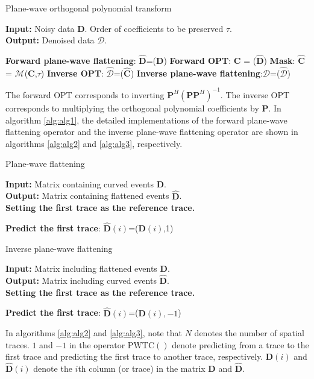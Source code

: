 \begin{algorithm}
  \caption{Plane-wave orthogonal polynomial transform}
  \textbf{Input:} Noisy data $\mathbf{D}$. Order of coefficients to be preserved $\tau$. \\
  \textbf{Output:} Denoised data $\mathcal{D}$. 
   \begin{algorithmic}[1]
     \State \textbf{Forward plane-wave flattening}: $\hat{\mathbf{D}}$=($\mathbf{D}$)
     \State \textbf{Forward OPT}: $\mathbf{C}$ = ($\hat{\mathbf{D}}$) 
     \State \textbf{Mask}:   $\hat{\mathbf{C}}$ = $\mathcal{M}$($\mathbf{C}$,$\tau$)
     \State \textbf{Inverse OPT}: $\hat{\mathcal{D}}$=($\hat{\mathbf{C}}$)
     \State \textbf{Inverse plane-wave flattening}:$\mathcal{D}$=($\hat{\mathcal{D}}$)
\end{algorithmic}
\label{alg:alg1}
\end{algorithm}
The forward OPT corresponds to inverting $\mathbf{P}^H(\mathbf{P}\mathbf{P}^H)^{-1}$. The inverse OPT corresponds to multiplying the orthogonal polynomial coefficients by $\mathbf{P}$. In algorithm \ref{alg:alg1}, the detailed implementations of the forward plane-wave flattening operator and the inverse plane-wave flattening operator are shown in algorithms \ref{alg:alg2} and \ref{alg:alg3}, respectively.

\begin{algorithm}
  \caption{Plane-wave flattening}
  \textbf{Input:} Matrix containing curved events $\mathbf{D}$. \\
  \textbf{Output:} Matrix containing flattened events $\hat{\mathbf{D}}$. \\
   \textbf{Setting the first trace as the reference trace.}
   \begin{algorithmic}[1]
    \State \textbf{Predict the first trace}: $\hat{\mathbf{D}}(i)$=($\mathbf{D}(i)$,1)  
       \EndFor
\end{algorithmic}
\label{alg:alg2}
\end{algorithm}

\begin{algorithm}
  \caption{Inverse plane-wave flattening}
  \textbf{Input:} Matrix including flattened events $\mathbf{D}$. \\
  \textbf{Output:} Matrix including curved events $\hat{\mathbf{D}}$. \\
   \textbf{Setting the first trace as the reference trace.}
   \begin{algorithmic}[1]
    \State \textbf{Predict the first trace}: $\hat{\mathbf{D}}(i)$=($\mathbf{D}(i),-1$)  
       \EndFor
\end{algorithmic}
\label{alg:alg3}
\end{algorithm}
In algorithms \ref{alg:alg2} and \ref{alg:alg3}, note that $N$ denotes the number of spatial traces. $1$ and $-1$ in the operator $\text{PWTC}()$ denote predicting from a trace to the first trace and predicting the first trace to another trace, respectively. $\mathbf{D}(i)$ and $\hat{\mathbf{D}}(i)$ denote the $i$th column (or trace) in the matrix 
$\mathbf{D}$ and $\hat{\mathbf{D}}$.



